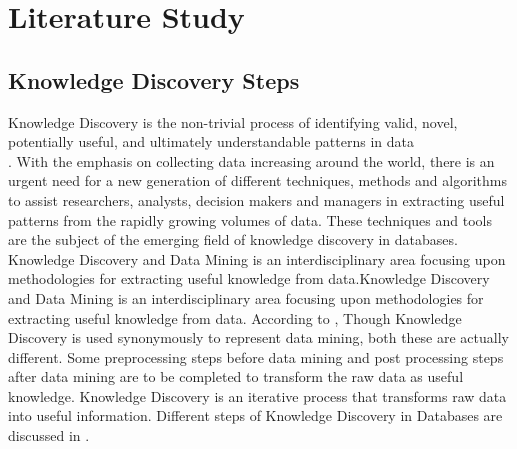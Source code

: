 


\chapter{Literature Study} %

\label{Literature Study} %




\section{Knowledge Discovery Steps}
Knowledge Discovery is the non-trivial process of identifying valid, novel, potentially useful, and ultimately understandable patterns in data \\\cite{knowledge discovery}. With the emphasis on collecting data increasing around the world, there is an urgent need for a new generation of different techniques, methods and algorithms to assist researchers, analysts, decision makers and managers in extracting useful patterns from the rapidly growing volumes of data. These techniques and tools are the subject of the emerging field of knowledge discovery in databases. Knowledge Discovery and Data Mining  is an interdisciplinary area focusing upon methodologies for extracting useful knowledge from data.Knowledge Discovery and Data Mining is an interdisciplinary area focusing upon methodologies for extracting useful knowledge from data. According to \cite{IBM}, Though Knowledge Discovery is used synonymously to represent data mining, both these are actually different. Some preprocessing steps before data mining and post processing steps after data mining are to be completed to transform the raw data as useful knowledge. \newline
Knowledge Discovery is an iterative process that transforms raw data into useful information. Different steps of Knowledge Discovery in Databases are discussed in \cite{kddsteps}.

